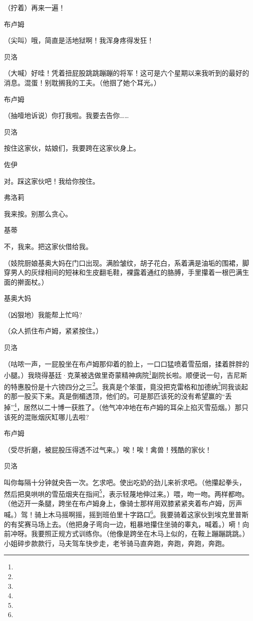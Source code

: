 \par （拧着）再来一遍！
\par 布卢姆
\par （尖叫）哦，简直是活地狱啊！我浑身疼得发狂！
\par 贝洛
\par （大喊）好哇！凭着扭屁股跳跳蹦蹦的将军！这可是六个星期以来我听到的最好的消息。混蛋！别耽搁我的工夫。（他掴了她个耳光。）
\par 布卢姆
\par （抽噎地诉说）你打我啦。我要去告你……
\par 贝洛
\par 按住这家伙，姑娘们，我要跨在这家伙身上。
\par 佐伊
\par 对。踩这家伙吧！我给你按住。
\par 弗洛莉
\par 我来按。别那么贪心。
\par 基蒂
\par 不，我来。把这家伙借给我。
\par （妓院厨娘基奥大妈在门口出现。满脸皱纹，胡子花白，系着满是油垢的围裙，脚穿男人的灰绿相间的短袜和生皮翻毛鞋，裸露着通红的胳膊，手里攥着一根巴满生面的擀面杖。）
\par 基奥大妈
\par （凶狠地）我能帮上忙吗?
\par （众人抓住布卢姆，紧紧按住。）
\par 贝洛
\par （咕哝一声，一屁股坐在布卢姆那仰着的脸上，一口口猛喷着雪茄烟，揉着胖胖的小腿。）我晓得基廷·克莱被选做里奇蒙精神病院\footnote{}副院长啦。顺便说一句，吉尼斯的特惠股份是十六镑四分之三\footnote{}。我真是个笨蛋，竟没把克雷格和加德纳\footnote{}同我谈起的那一股买下来。真是倒楣透顶，他们的。可是那匹该死的没有希望赢的“丢掉”\footnote{}，居然以二十博一获胜了。（他气冲冲地在布卢姆的耳朵上掐灭雪茄烟。）那只该死的混账烟灰缸哪儿去啦?
\par 布卢姆
\par （受尽折磨，被屁股压得透不过气来。）唉！唉！禽兽！残酷的家伙！
\par 贝洛
\par 叫你每隔十分钟就央告一次。乞求吧。使出吃奶的劲儿来祈求吧。（他攥起拳头，然后把臭哄哄的雪茄烟夹在指间\footnote{}，表示轻蔑地伸过来。）喂，吻一吻。两样都吻。（他迈开一条腿，跨坐在布卢姆身上，像骑士那样用双膝紧紧夹着布卢姆，厉声喊。）驾！骑上木马摇啊摇，摇到班伯里十字路口\footnote{}。我要骑着这家伙到埃克里普斯的有奖赛马场上去。（他把身子弯向一边，粗暴地攥住坐骑的睾丸，喊着。）嗬！向前冲呀。我要照正规方式训练你。（他像是跨坐在木马上似的，在鞍上蹦蹦跳跳。）小姐碎步款款行，马夫驾车快步走，老爷骑马直奔跑，奔跑，奔跑，奔跑。
